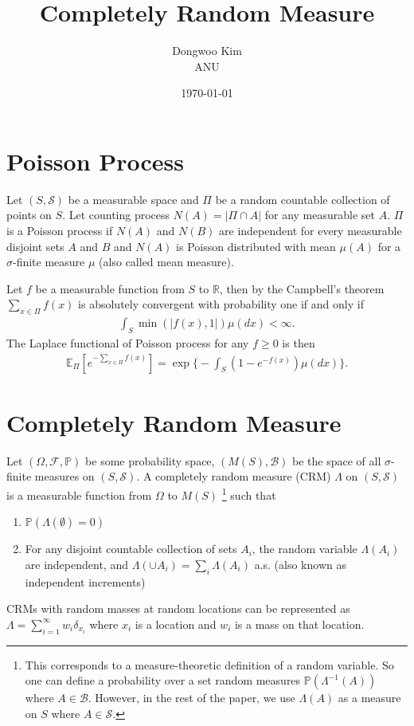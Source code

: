 \documentclass{article}
\title{Completely Random Measure}
\date{\today}
\author{Dongwoo Kim\\ANU}
\begin{document}
\maketitle

\section{Poisson Process}
\label{sec:pp}
Let $(S, \mathcal{S})$ be a measurable space and $\Pi$ be a random countable collection of points on $S$. Let  counting process $N(A) = |\Pi \cap A|$ for any measurable set $A$. $\Pi$ is a Poisson process if $N(A)$ and $N(B)$ are independent for every measurable disjoint sets $A$ and $B$ and $N(A)$ is Poisson distributed with mean $\mu(A)$ for a $\sigma$-finite measure $\mu$ (also called mean measure).

Let $f$ be a measurable function from $S$ to $\mathbb{R}$, then by the Campbell's theorem \citep{kingman1993poisson} $\sum_{x\in \Pi} f(x)$ is absolutely convergent with probability one if and only if
\begin{align}
\int_{S} \min(|f(x), 1|)\mu(dx) < \infty.
\end{align}
The Laplace functional of Poisson process for any $f \ge 0$ is then
\begin{align}
\mathbb{E}_{\Pi}[e^{-\sum_{x \in \Pi}f(x)}] = \exp \Bigg\{ - \int_{S} (1-e^{-f(x)})\mu(dx) \Bigg\}.
\end{align}

\section{Completely Random Measure}
Let $(\Omega, \mathcal{F}, \mathbb{P})$ be some probability space, $(M(S), \mathcal{B})$ be the space of all $\sigma$-finite measures on $(S, \mathcal{S})$. A completely random measure (CRM) $\Lambda$ on $(S, \mathcal{S})$ is a measurable function from $\Omega$ to $M(S)$ \footnote{This corresponds to a measure-theoretic definition of a random variable. So one can define a probability over a set random measures $\mathbb{P}(\Lambda^{-1}(A))$ where $A \in \mathcal{B}$. However, in the rest of the paper, we use $\Lambda(A)$ as a measure on $S$ where $A \in \mathcal{S}$.} such that
\begin{enumerate}
\item $\mathbb{P}(\Lambda(\emptyset) = 0)$
\item For any disjoint countable collection of sets $A_i$, the random variable $\Lambda(A_i)$ are independent, and $\Lambda(\cup A_i) = \sum_i \Lambda(A_i)$ a.s. (also known as independent increments)
\end{enumerate}
CRMs with random masses at random locations can be represented as $\Lambda = \sum_{i=1}^{\infty} w_i \delta_{x_i}$ where $x_i$ is a location and $w_i$ is a mass on that location.
\end{document}
